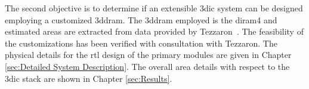The second objective is to determine if an extensible \ac{3dic} system can be designed employing a customized \ac{3ddram}.
The \ac{3ddram} employed is the \ac{diram4} and estimated areas are extracted from data provided by Tezzaron\textregistered~\cite{patti2014}.
The feasibility of the customizations has been verified with consultation with Tezzaron\textregistered.
The physical details for the \ac{rtl} design of the primary modules are given in Chapter \ref{sec:Detailed System Description}.
The overall area details with respect to the \ac{3dic} stack are shown in Chapter \ref{sec:Results}.



